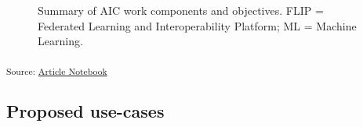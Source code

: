 \documentclass[
  letterpaper,
  DIV=11,
  numbers=noendperiod]{scrartcl}
\begin{document}
\begin{figure}


\caption{\label{fig-aic-objectives}Summary of AIC work components and
objectives. FLIP = Federated Learning and Interoperability Platform; ML
= Machine Learning.}

\end{figure}%

\textsubscript{Source:
\href{https://d3london.github.io/sde_aic_docs/index.qmd.html}{Article
Notebook}}

\subsection{Proposed use-cases}\label{proposed-use-cases}
\end{document}
